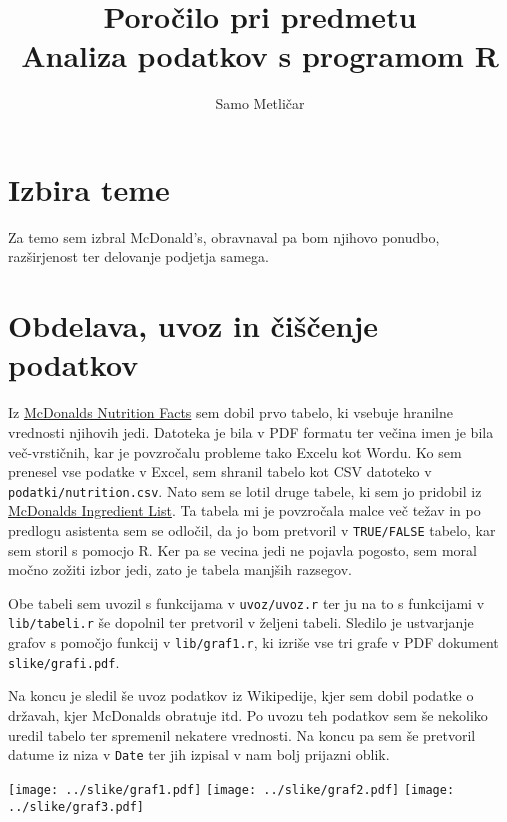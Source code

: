 \documentclass[11pt,a4paper]{article}
\begin{document}
\title{Poročilo pri predmetu \\
Analiza podatkov s programom R}
\author{Samo Metličar}
\maketitle

\section{Izbira teme}

Za temo sem izbral McDonald's, obravnaval pa bom njihovo ponudbo, razširjenost ter delovanje podjetja samega.

\section{Obdelava, uvoz in čiščenje podatkov}

Iz \href{http://nutrition.mcdonalds.com/getnutrition/nutritionfacts.pdf}{McDonalds Nutrition Facts} sem dobil prvo tabelo, ki vsebuje hranilne vrednosti njihovih jedi. Datoteka je bila v PDF formatu ter večina imen je bila več-vrstičnih, kar je povzročalu probleme tako Excelu kot Wordu. Ko sem prenesel vse podatke v Excel, sem shranil tabelo kot CSV datoteko v \verb|podatki/nutrition.csv|. Nato sem se lotil druge tabele, ki sem jo pridobil iz \href{http://nutrition.mcdonalds.com/getnutrition/ingredientslist.pdf}{McDonalds Ingredient List}. Ta tabela mi je povzročala malce več težav in po predlogu asistenta sem se odločil, da jo bom pretvoril v \verb|TRUE/FALSE| tabelo, kar sem storil s pomocjo R. Ker pa se vecina jedi ne pojavla pogosto, sem moral močno zožiti izbor jedi, zato je tabela manjših razsegov. \par

Obe tabeli sem uvozil s funkcijama v \verb|uvoz/uvoz.r| ter ju na to s funkcijami v \verb|lib/tabeli.r| še dopolnil ter pretvoril v željeni tabeli. Sledilo je ustvarjanje grafov s pomočjo funkcij v \verb|lib/graf1.r|, ki izriše vse tri grafe v PDF dokument \verb|slike/grafi.pdf|. \par

Na koncu je sledil še uvoz podatkov iz Wikipedije, kjer sem dobil podatke o državah, kjer McDonalds obratuje itd. Po uvozu teh podatkov sem še nekoliko uredil tabelo ter spremenil nekatere vrednosti. Na koncu pa sem še pretvoril datume iz niza v \verb|Date| ter jih izpisal v nam bolj prijazni oblik.

\texttt{[image: ../slike/graf1.pdf]}
\texttt{[image: ../slike/graf2.pdf]}
\texttt{[image: ../slike/graf3.pdf]}
\end{document}

